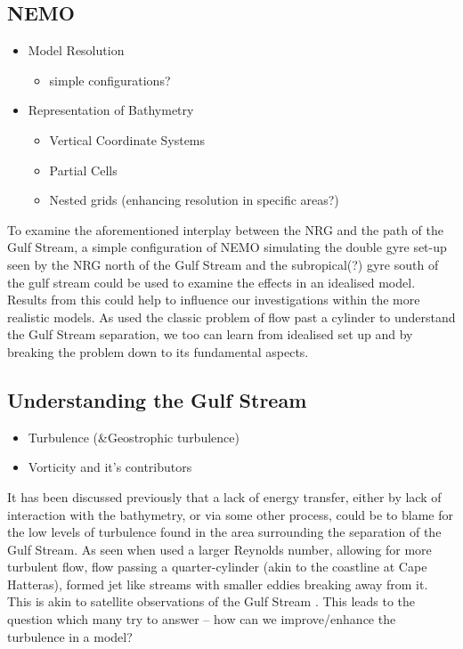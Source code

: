 \documentclass[a4paper,11pt]{article}
\begin{document}
\subsection{NEMO}
\begin{itemize}
  \item Model Resolution \citep{Ezer2016b}
  \begin{itemize}
    \item simple configurations? \citep{Tansley2001}
  \end{itemize}
  \item Representation of Bathymetry
  \begin{itemize}
    \item Vertical Coordinate Systems
    \item Partial Cells
    \item Nested grids (enhancing resolution in specific areas?) 
  \end{itemize}
\end{itemize}


To examine the aforementioned interplay between the NRG and the path of the Gulf Stream, a simple configuration of NEMO simulating the double gyre set-up seen by the NRG north of the Gulf Stream and the subropical(?) gyre south of the gulf stream could be used to examine the effects in an idealised model. Results from this could help to influence our investigations within the more realistic models. As \citep{Tansley2001} used the classic problem of flow past a cylinder to understand the Gulf Stream separation, we too can learn from idealised set up and by breaking the problem down to its fundamental aspects.

\subsection{Understanding the Gulf Stream}
\begin{itemize}
  \item Turbulence    (\&Geostrophic turbulence)
  \item Vorticity and it's contributors
\end{itemize}
  
It has been discussed previously  that a lack of energy transfer, either by lack of interaction with the bathymetry, or via some other process, could be to blame for the low levels of turbulence found in the area surrounding the separation of the Gulf Stream. As seen when \citep{Tansley2001} used a larger Reynolds number, allowing for more turbulent flow, flow passing a quarter-cylinder (akin to the coastline at Cape Hatteras), formed jet like streams with smaller eddies breaking away  from it. This is akin to satellite observations of the Gulf Stream . This leads to the question which many try to answer – how can we improve/enhance the turbulence in a model?   
  
\end{document}
